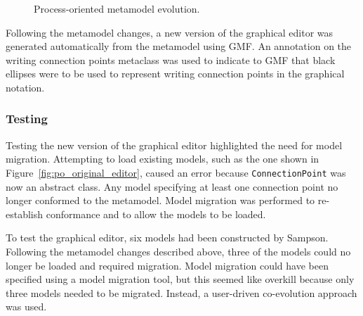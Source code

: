 \begin{figure}[htbp]
	\centering
	\caption{Process-oriented metamodel evolution.}
\label{fig:po_mms}
\end{figure}

Following the metamodel changes, a new version of the graphical editor was generated automatically from the metamodel using GMF. An annotation on the writing connection points metaclass was used to indicate to GMF that black ellipses were to be used to represent writing connection points in the graphical notation.

\subsubsection{Testing}
Testing the new version of the graphical editor highlighted the need for model migration. Attempting to load existing models, such as the one shown in Figure~\ref{fig:po_original_editor}, caused an error because \texttt{Co\-nn\-ec\-ti\-onP\-oi\-nt} was now an abstract class. Any model specifying at least one connection point no longer conformed to the metamodel. Model migration was performed to re-establish conformance and to allow the models to be loaded. 

To test the graphical editor, six models had been constructed by Sampson. Following the metamodel changes described above, three of the models could no longer be loaded and required migration. Model migration could have been specified using a model migration tool, but this seemed like overkill because only three models needed to be migrated. Instead, a user-driven co-evolution approach was used.

